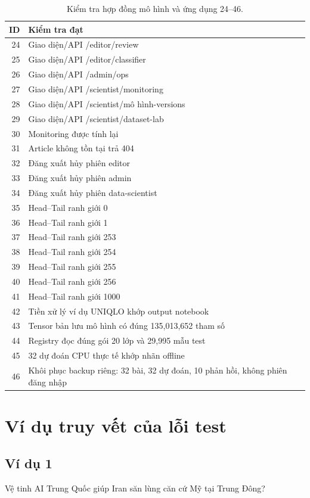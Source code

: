 \begin{table}[H]\centering\small\caption{Kiểm tra hợp đồng mô hình và ứng dụng 24--46.}
\begin{tabular}{r p{135mm}}\toprule ID & Kiểm tra đạt\\\midrule
24 & Giao diện/API /editor/review\\
25 & Giao diện/API /editor/classifier\\
26 & Giao diện/API /admin/ops\\
27 & Giao diện/API /scientist/monitoring\\
28 & Giao diện/API /scientist/mô hình-versions\\
29 & Giao diện/API /scientist/dataset-lab\\
30 & Monitoring được tính lại\\
31 & Article không tồn tại trả 404\\
32 & Đăng xuất hủy phiên editor\\
33 & Đăng xuất hủy phiên admin\\
34 & Đăng xuất hủy phiên data-scientist\\
35 & Head–Tail ranh giới 0\\
36 & Head–Tail ranh giới 1\\
37 & Head–Tail ranh giới 253\\
38 & Head–Tail ranh giới 254\\
39 & Head–Tail ranh giới 255\\
40 & Head–Tail ranh giới 256\\
41 & Head–Tail ranh giới 1000\\
42 & Tiền xử lý ví dụ UNIQLO khớp output notebook\\
43 & Tensor bản lưu mô hình có đúng 135,013,652 tham số\\
44 & Registry đọc đúng gói 20 lớp và 29,995 mẫu test\\
45 & 32 dự đoán CPU thực tế khớp nhãn offline\\
46 & Khôi phục backup riêng: 32 bài, 32 dự đoán, 10 phản hồi, không phiên đăng nhập\\
\bottomrule\end{tabular}\end{table}
\def\UrlBreaks{\do\/\do-\do.}
\section{Ví dụ truy vết của lỗi test}
\subsection{Ví dụ 1}
Vệ tinh AI Trung Quốc giúp Iran săn lùng căn cứ Mỹ tại Trung Đông?

